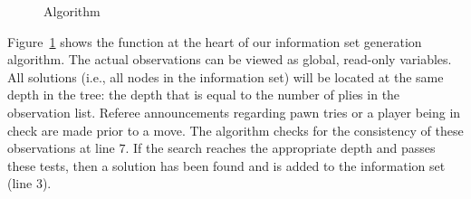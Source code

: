 \documentclass[10pt, conference, compsocconf]{IEEEtran}
\begin{document}
\begin{figure}[htpb]
\small
\begin{boxedminipage}{\columnwidth}
\begin{algorithmic}[1]
  \EndIf
\EndFunction
\end{algorithmic}
\end{boxedminipage}
\caption{Algorithm}
\label{codelisting1}
\end{figure}


Figure~\ref{codelisting1} shows the function at the heart of our information set generation algorithm.  The actual
observations can be viewed as global, read-only variables.  All solutions (i.e., all nodes in the information set) will
be located at the same depth in the tree: the depth that is equal to the number of plies in the observation list.
Referee announcements regarding pawn tries or a player being in check are made prior to a move.  The algorithm checks
for the consistency of these observations at line $7$.  If the search reaches the appropriate depth and passes these
tests, then a solution has been found and is added to the information set (line $3$).  
\end{document}
